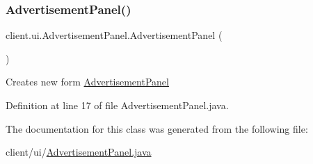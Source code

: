 \subsubsection{\texorpdfstring{Advertisement\+Panel()}{AdvertisementPanel()}}
{\footnotesize\ttfamily client.\+ui.\+Advertisement\+Panel.\+Advertisement\+Panel (\begin{DoxyParamCaption}{ }\end{DoxyParamCaption})}

Creates new form \hyperlink{classclient_1_1ui_1_1_advertisement_panel}{Advertisement\+Panel} 

Definition at line 17 of file Advertisement\+Panel.\+java.



The documentation for this class was generated from the following file\+:\begin{DoxyCompactItemize}
\item 
client/ui/\hyperlink{_advertisement_panel_8java}{Advertisement\+Panel.\+java}\end{DoxyCompactItemize}
